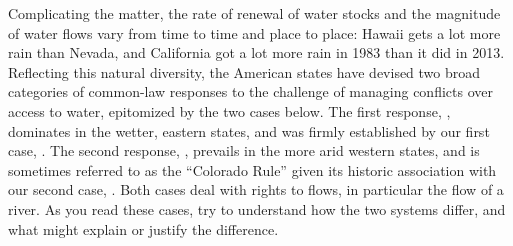 Complicating the matter, the rate of renewal of water stocks and the magnitude
of water flows vary from time to time and place to place: Hawaii gets a lot more
rain than Nevada, and California got a lot more rain in 1983 than it did in
2013. Reflecting this natural diversity, the American states have devised two
broad categories of common-law responses to the challenge of managing conflicts
over access to water, epitomized by the two cases below. The first response,
, dominates in the wetter, eastern states, and was
firmly established by our first case, . The second
response, , prevails in the more arid western
states, and is sometimes referred to as the ``Colorado Rule'' given its historic
association with our second case, . Both
cases deal with rights to flows, in particular the flow of a river. As you read
these cases, try to understand how the two systems differ, and what might
explain or justify the difference.

